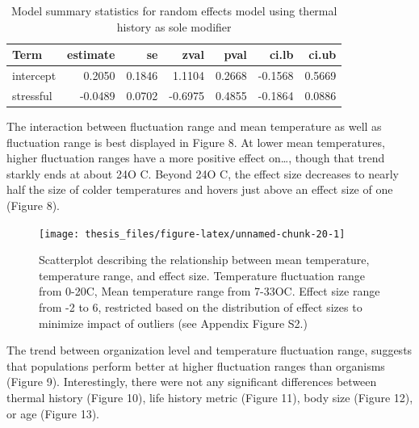 \documentclass[12pt,twoside]{reedthesis}
\begin{document}
\begin{table}

\caption{\label{tab:unnamed-chunk-19}Model summary statistics for random effects model using thermal history as sole modifier}
\centering
\begin{tabular}[t]{lrrrrrr}
\toprule
\textbf{Term} & \textbf{estimate} & \textbf{se} & \textbf{zval} & \textbf{pval} & \textbf{ci.lb} & \textbf{ci.ub}\\
\midrule
intercept & 0.2050 & 0.1846 & 1.1104 & 0.2668 & -0.1568 & 0.5669\\
stressful & -0.0489 & 0.0702 & -0.6975 & 0.4855 & -0.1864 & 0.0886\\
\bottomrule
\end{tabular}
\end{table}
The interaction between fluctuation range and mean temperature as well as fluctuation range is best displayed in Figure 8. At lower mean temperatures, higher fluctuation ranges have a more positive effect on\ldots{}, though that trend starkly ends at about 24O C. Beyond 24O C, the effect size decreases to nearly half the size of colder temperatures and hovers just above an effect size of one (Figure 8).
\begin{figure}
\texttt{[image: thesis\_files/figure-latex/unnamed-chunk-20-1]} \caption{Scatterplot describing the relationship between mean temperature, temperature range, and effect size. Temperature fluctuation range from 0-20C, Mean temperature range from 7-33OC. Effect size range from -2 to 6, restricted based on the distribution of effect sizes to minimize impact of outliers (see Appendix Figure S2.)}\label{fig:unnamed-chunk-20}
\end{figure}
The trend between organization level and temperature fluctuation range, suggests that populations perform better at higher fluctuation ranges than organisms (Figure 9). Interestingly, there were not any significant differences between thermal history (Figure 10), life history metric (Figure 11), body size (Figure 12), or age (Figure 13).
\end{document}
